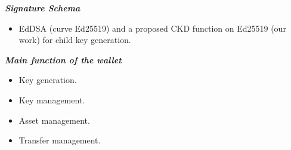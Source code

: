 {\textit {\textbf{Signature Schema}}}
\begin{itemize}
    \item EdDSA (curve Ed25519) and a proposed CKD function on Ed25519 (our work) for child key generation.
\end{itemize}

{\textit {\textbf{Main function of the wallet}}}
\begin{itemize}
    \item Key generation.
    \item Key management.
    \item Asset management.
    \item Transfer management.
\end{itemize}